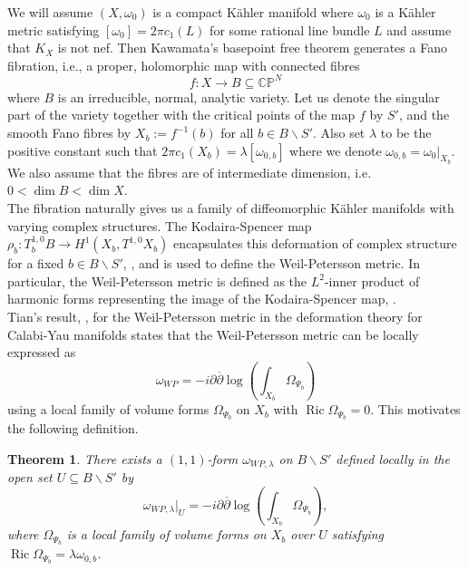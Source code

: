 \documentclass[12pt]{article}
\newtheorem{theorem}{Theorem}[section]
\numberwithin{equation}{section}
\newcommand{\CP}{\mathbb{CP}}
\renewcommand{\d}{\partial}
\newcommand{\dbar}{\overline{\partial}}
\DeclareMathOperator{\Ric}{Ric}
\begin{document}
\noindent We will assume $(X,\omega_0)$ is a compact K\"ahler manifold where $\omega_0$ is a K\"ahler metric satisfying $[\omega_0] = 2\pi c_1(L)$ for some rational line bundle $L$ and assume that $K_X$ is not nef. Then Kawamata's basepoint free theorem generates a Fano fibration, i.e., a proper, holomorphic map with connected fibres
\begin{equation*}
    f: X \to B \subseteq \CP^N
\end{equation*}
where $B$ is an irreducible, normal, analytic variety. Let us denote the singular part of the variety together with the critical points of the map $f$ by $S'$, and the smooth Fano fibres by $X_b := f^{-1}(b)$ for all $b \in B \backslash S'$. Also set $\lambda$ to be the positive constant such that $2 \pi c_1(X_b) = \lambda [\omega_{0,b}]$ where we denote $\omega_{0,b} = \omega_0|_{X_b}$. We also assume that the fibres are of intermediate dimension, i.e. $0 < \dim B < \dim X$.\\

\noindent The fibration naturally gives us a family of diffeomorphic K\"ahler manifolds with varying complex structures. The Kodaira-Spencer map $\rho_b: T^{1,0}_b B \to H^{1}(X_b,T^{1,0}X_b)$ encapsulates this deformation of complex structure for a fixed $b \in B \backslash S'$, \cite{H05,K86,V02,T89}, and is used to define the Weil-Petersson metric. In particular, the Weil-Petersson metric is defined as the $L^2$-inner product of harmonic forms representing the image of the Kodaira-Spencer map, \cite{FS90, T87}.\\ 
Tian's result, \cite[Thm. 2]{T87}, for the Weil-Petersson metric in the deformation theory for Calabi-Yau manifolds states that the Weil-Petersson metric can be locally expressed as
\begin{equation*}
    \omega_{WP} = -i\d\dbar\log\left(\int_{X_b} \Omega_{\Psi_b}\right)
\end{equation*}
using a local family of volume forms $\Omega_{\Psi_b}$ on $X_b$ with $\Ric \Omega_{\Psi_b} = 0$. This motivates the following definition.

\begin{theorem}
There exists a $(1,1)$-form $\omega_{WP,\lambda}$ on $B \backslash S'$ defined locally in the open set $U \subseteq B \backslash S'$ by
\begin{equation*}
    \omega_{WP,\lambda}|_{U} = -i\d\dbar \log \left(\int_{X_b} \Omega_{\Psi_b}\right),
\end{equation*}
where $\Omega_{\Psi_b}$ is a local family of volume forms on $X_b$ over $U$ satisfying $\Ric \Omega_{\Psi_b} = \lambda \omega_{0,b}$.
\end{theorem}
\end{document}

